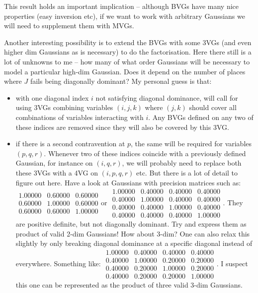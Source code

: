 This result holds an important implication -- although BVGs have many
nice properties (easy inversion etc), if we want to work with arbitrary
Gaussians we will need to supplement them with MVGs.

Another interesting possibility is to extend the BVGs with some 3VGs
(and even higher dim Gaussians as is necessary) to do the factorisation.
Here there still is a lot of unknowns to me -- how many of what order
Gaussians will be necessary to model a particular high-dim Gaussian.
Does it depend on the number of places where $J$ fails being diagonally
dominant? My personal guess is that:
\begin{itemize}
\item with one diagonal index $i$ not satisfying diagonal dominance, will
call for using 3VGs combining variables $(i,j,k)$ where $(j,k)$
should cover all combinations of variables interacting with $i$.
Any BVGs defined on any two of these indices are removed since they
will also be covered by this 3VG.
\item if there is a second contravention at $p$, the same will be required
for variables $(p,q,r)$. Whenever two of these indices coincide with
a previously defined Gaussian, for instance on $(i,q,r)$, we will
probably need to replace both these 3VGs with a 4VG on $(i,p,q,r)$
etc. But there is a lot of detail to figure out here. Have a look
at Gaussians with precision matrices such as: $\begin{array}{ccc}
1.00000 & 0.60000 & 0.60000\\
0.60000 & 1.00000 & 0.60000\\
0.60000 & 0.60000 & 1.00000
\end{array}$or $\begin{array}{cccc}
1.00000 & 0.40000 & 0.40000 & 0.40000\\
0.40000 & 1.00000 & 0.40000 & 0.40000\\
0.40000 & 0.40000 & 1.00000 & 0.40000\\
0.40000 & 0.40000 & 0.40000 & 1.00000
\end{array}$. They are positive definite, but not diagonally dominant. Try and
express them as product of valid 2-dim Gaussians! How about 3-dim?
One can also relax this slightly by only breaking diagonal dominance
at a specific diagonal instead of everywhere. Something like: $\begin{array}{cccc}
1.00000 & 0.40000 & 0.40000 & 0.40000\\
0.40000 & 1.00000 & 0.20000 & 0.20000\\
0.40000 & 0.20000 & 1.00000 & 0.20000\\
0.40000 & 0.20000 & 0.20000 & 1.00000
\end{array}$. I suspect this one can be represented as the product of three valid
3-dim Gaussians.
\end{itemize}

